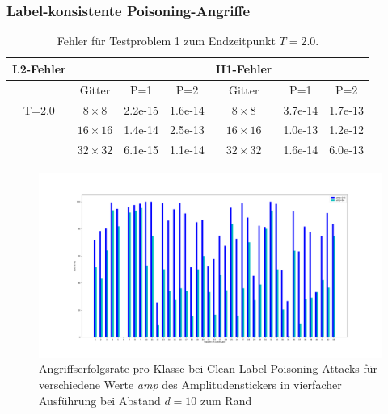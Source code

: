 \documentclass[twoside, 11pt,a4paper]{article}
\numberwithin{equation}{section}
\begin{document}
	\subsubsection{Label-konsistente Poisoning-Angriffe}
	\begin{table}[h]
		\begin{center}
			\begin{tabular}{| c c c c | c c c |}
				\hline
				\textbf{L2-Fehler} & & & & \textbf{H1-Fehler} & & \\
				\hline 
				& Gitter & P=1 & P=2 & Gitter & P=1 & P=2  \\
				
				\hline
				
				T=2.0 	&$8 \times 8 $ & 2.2e-15 & 1.6e-14 & $8 \times 8 $ & 3.7e-14 & 1.7e-13 \\
				&$16\times 16$ & 1.4e-14 & 2.5e-13 & $16\times 16$ & 1.0e-13 & 1.2e-12 \\
				&$32\times 32$ & 6.1e-15 & 1.1e-14 & $32\times 32$ & 1.6e-14 & 6.0e-13 \\
				\hline
			\end{tabular}
			\caption{Fehler für Testproblem 1 zum Endzeitpunkt $T=2.0$.}
			\label{errors_testproblem1}
		\end{center}
	\end{table}
		
	\begin{figure}[h]
		\begin{center}
			\includegraphics[width=0.5\textheight]{Vergleich_AER_CLPA.png}
			\caption{Angriffserfolgsrate pro Klasse bei Clean-Label-Poisoning-Attacks für verschiedene Werte \textit{amp} des Amplitudenstickers in vierfacher Ausführung bei Abstand $d=10$ zum Rand}
			\label{fig:AER_proKlasse_CLPA}
		\end{center}
	\end{figure}
\end{document}
